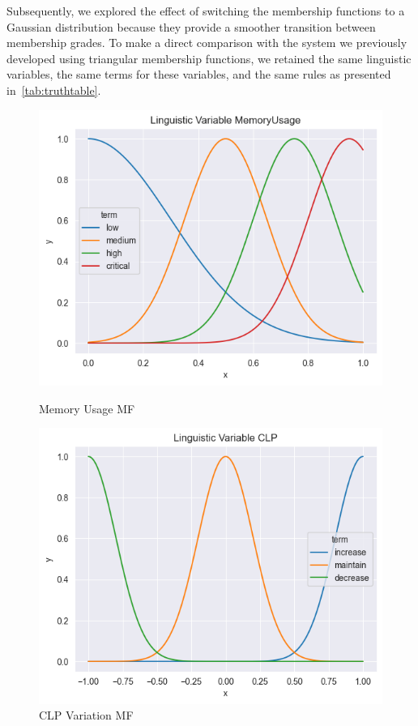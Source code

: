 \documentclass[titlepage]{article}
\begin{document}
Subsequently, we explored the effect of switching the membership functions to a Gaussian distribution because they provide a smoother transition between membership grades.
To make a direct comparison with the system we previously developed using triangular membership functions, we retained the same linguistic variables, the same terms for these variables, and the same rules as presented in~\cref{tab:truthtable}.

\begin{figure}[H]
    \centering
    \begin{minipage}{0.45\textwidth}
        \centering
        \includegraphics[width=\textwidth]{../images/guassian_MemoryUsage}
        \caption{Memory Usage MF}
        \label{fig:memory_usage_gaussian}
    \end{minipage}
    \hfill
    \begin{minipage}{0.45\textwidth}
        \centering
        \includegraphics[width=\textwidth]{../images/guassian_CLP}
        \caption{CLP Variation MF}
        \label{fig:clp_gaussian}
    \end{minipage}
\end{figure}
\end{document}
